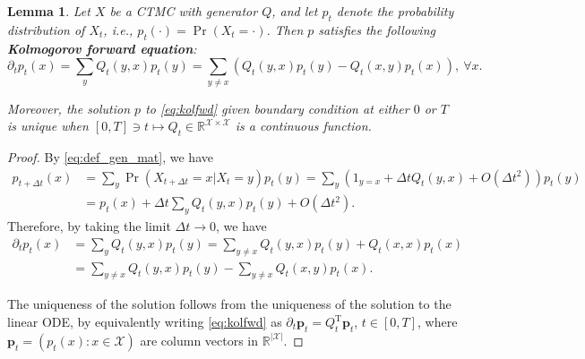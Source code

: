 \documentclass{article}
\newtheorem{lemma}{Lemma}
\theoremstyle{remark}
\newcommand{\ro}[1]{\left(#1\right)} %
\newcommand{\tp}{^\mathrm{T}}
\newcommand{\R}{\mathbb{R}}
\newcommand{\cX}{\mathcal{X}}
\newcommand{\bp}{\bm{p}}
\begin{document}
\begin{lemma}
Let $X$ be a CTMC with generator $Q$, and let $p_t$ denote the probability distribution of $X_t$, i.e., $p_t(\cdot)=\Pr(X_t=\cdot)$. Then $p$ satisfies the following \textbf{Kolmogorov forward equation}:
\begin{equation}
    \partial_tp_t(x)=\sum_y Q_t(y,x)p_t(y)=\sum_{y\ne x}(Q_t(y,x)p_t(y)-Q_t(x,y)p_t(x)),~\forall x.
    \label{eq:kolfwd}
\end{equation}
\label{lem:kolfwd}

Moreover, the solution $p$ to \cref{eq:kolfwd} given boundary condition at either $0$ or $T$ is unique when $[0,T]\ni t\mapsto Q_t\in\R^{\cX\times\cX}$ is a continuous function.
\end{lemma}
\begin{proof}
By \cref{eq:def_gen_mat}, we have
\begin{align*}
    p_{t+\Delta t}(x)&=\sum_y \Pr(X_{t+\Delta t}=x|X_t=y)p_t(y)=\sum_y\ro{1_{y=x}+\Delta tQ_t(y,x)+O(\Delta t^2)}p_t(y)\\
    &=p_t(x)+\Delta t\sum_yQ_t(y,x)p_t(y)+O(\Delta t^2).
\end{align*}
Therefore, by taking the limit $\Delta t\to0$, we have
\begin{align*}
    \partial_tp_t(x)&=\sum_yQ_t(y,x)p_t(y)=\sum_{y\ne x}Q_t(y,x)p_t(y)+Q_t(x,x)p_t(x)\\
    &=\sum_{y\ne x}Q_t(y,x)p_t(y)-\sum_{y\ne x}Q_t(x,y)p_t(x).
\end{align*}

The uniqueness of the solution follows from the uniqueness of the solution to the linear ODE, by equivalently writing \cref{eq:kolfwd} as $\partial_t\bp_t=Q_t\tp\bp_t$, $t\in[0,T]$, where $\bp_t=(p_t(x):x\in\cX)$ are column vectors in $\R^{|\cX|}$. 
\end{proof}
\end{document}
